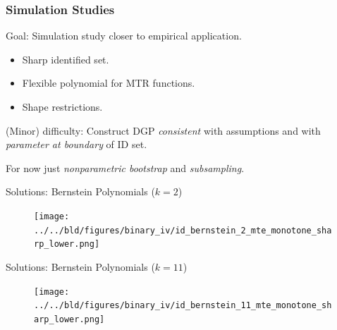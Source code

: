 \documentclass[11pt, aspectratio=169]{beamer}
\begin{document}
\begin{frame}
    \frametitle{Simulation Studies}
    Goal: Simulation study closer to empirical application.

    \vspace{0.5cm}

    \begin{itemize}
        \item Sharp identified set.
        \item Flexible polynomial for MTR functions.
        \item Shape restrictions.
    \end{itemize}

    \pause

    \vspace{0.5cm}

    (Minor) difficulty: Construct DGP \textit{consistent} with assumptions and with \textit{parameter at boundary} of ID set.

    \vspace{0.5cm}

    For now just \textit{nonparametric bootstrap} and \textit{subsampling}.

\end{frame}

\begin{frame}{Solutions: Bernstein Polynomials ($k=2$)}

    \begin{figure}
        \centering
        \texttt{[image: ../../bld/figures/binary\_iv/id\_bernstein\_2\_mte\_monotone\_sharp\_lower.png]}
    \end{figure}


\end{frame}

\begin{frame}{Solutions: Bernstein Polynomials ($k=11$)}

    \begin{figure}
        \centering
        \texttt{[image: ../../bld/figures/binary\_iv/id\_bernstein\_11\_mte\_monotone\_sharp\_lower.png]}
    \end{figure}


\end{frame}



\end{document}
